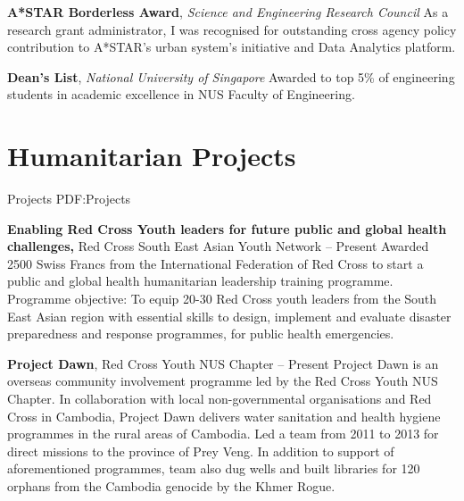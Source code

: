 \documentclass[letterpaper,10pt,oneside]{article}
\begin{document}
\begin{body}

\textbf{A*STAR Borderless Award}, \textit{Science and Engineering Research Council}
\hfill
{}
\BulletItem
As a research grant administrator, I was recognised for outstanding cross agency policy contribution to A*STAR's urban system's initiative and Data Analytics platform.
\GapNoBreak
\medskip

\textbf{Dean's List}, \textit{National University of Singapore}
\hfill
{}
\BulletItem
Awarded to top 5\% of engineering students in academic excellence in NUS Faculty of Engineering.
\GapNoBreak


\section
{Humanitarian Projects}
{Projects}
{PDF:Projects}

\textbf{Enabling Red Cross Youth leaders for future public and global health challenges,} Red Cross South East Asian Youth Network
\hfill
{} -- Present
\BulletItem Awarded 2500 Swiss Francs from the International Federation of Red Cross to start a public and global health humanitarian leadership training programme.
\BulletItem Programme objective: To equip 20-30 Red Cross youth leaders from the South East Asian region with essential skills to design, implement and evaluate disaster preparedness and response programmes, for public health emergencies.
\GapNoBreak
\medskip

\textbf{Project Dawn}, Red Cross Youth NUS Chapter
\hfill
{} -- Present
\BulletItem Project Dawn is an overseas community involvement programme led by the Red Cross Youth NUS Chapter. In collaboration with local non-governmental organisations and Red Cross in Cambodia, Project Dawn delivers water sanitation and health hygiene programmes in the rural areas of Cambodia.
\BulletItem Led a team from 2011 to 2013 for direct missions to the province of Prey Veng. In addition to support of aforementioned programmes, team also dug wells and built libraries for 120 orphans from the Cambodia genocide by the Khmer Rogue.


\end{body}
\end{document}
